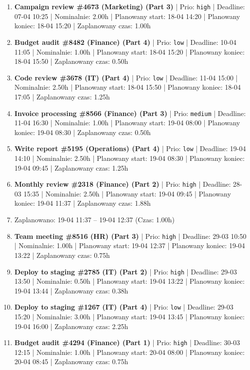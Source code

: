 {\begin{enumerate}
  \item [\textbf{14625}] \textbf{Campaign review \#4673 (Marketing) (Part 3)} | Prio: \texttt{high} | Deadline: 07-04 10:25 | Nominalnie: 2.00h | Planowany start: 18-04 14:20 | Planowany koniec: 18-04 15:20 | Zaplanowany czas: 1.00h
  \item [\textbf{14694}] \textbf{Budget audit \#8482 (Finance) (Part 4)} | Prio: \texttt{low} | Deadline: 10-04 11:05 | Nominalnie: 1.00h | Planowany start: 18-04 15:20 | Planowany koniec: 18-04 15:50 | Zaplanowany czas: 0.50h
  \item [\textbf{14699}] \textbf{Code review \#3678 (IT) (Part 4)} | Prio: \texttt{low} | Deadline: 11-04 15:00 | Nominalnie: 2.50h | Planowany start: 18-04 15:50 | Planowany koniec: 18-04 17:05 | Zaplanowany czas: 1.25h
  \item [\textbf{14675}] \textbf{Invoice processing \#8566 (Finance) (Part 3)} | Prio: \texttt{medium} | Deadline: 11-04 16:30 | Nominalnie: 1.00h | Planowany start: 19-04 08:00 | Planowany koniec: 19-04 08:30 | Zaplanowany czas: 0.50h
  \item [\textbf{14687}] \textbf{Write report \#5195 (Operations) (Part 4)} | Prio: \texttt{low} | Deadline: 19-04 14:10 | Nominalnie: 2.50h | Planowany start: 19-04 08:30 | Planowany koniec: 19-04 09:45 | Zaplanowany czas: 1.25h
  \item [\textbf{14618}] \textbf{Monthly review \#2318 (Finance) (Part 2)} | Prio: \texttt{high} | Deadline: 28-03 15:35 | Nominalnie: 2.50h | Planowany start: 19-04 09:45 | Planowany koniec: 19-04 11:37 | Zaplanowany czas: 1.88h
  \item [\textbf{PRZERWA}] Zaplanowano: 19-04 11:37 -- 19-04 12:37 (Czas: 1.00h)
  \item [\textbf{14624}] \textbf{Team meeting \#8516 (HR) (Part 3)} | Prio: \texttt{high} | Deadline: 29-03 10:50 | Nominalnie: 1.00h | Planowany start: 19-04 12:37 | Planowany koniec: 19-04 13:22 | Zaplanowany czas: 0.75h
  \item [\textbf{14623}] \textbf{Deploy to staging \#2785 (IT) (Part 2)} | Prio: \texttt{high} | Deadline: 29-03 13:50 | Nominalnie: 0.50h | Planowany start: 19-04 13:22 | Planowany koniec: 19-04 13:44 | Zaplanowany czas: 0.38h
  \item [\textbf{14686}] \textbf{Deploy to staging \#1267 (IT) (Part 4)} | Prio: \texttt{low} | Deadline: 29-03 15:20 | Nominalnie: 3.00h | Planowany start: 19-04 13:45 | Planowany koniec: 19-04 16:00 | Zaplanowany czas: 2.25h
  \item [\textbf{14619}] \textbf{Budget audit \#4294 (Finance) (Part 1)} | Prio: \texttt{high} | Deadline: 30-03 12:15 | Nominalnie: 1.00h | Planowany start: 20-04 08:00 | Planowany koniec: 20-04 08:45 | Zaplanowany czas: 0.75h

\end{enumerate}}
